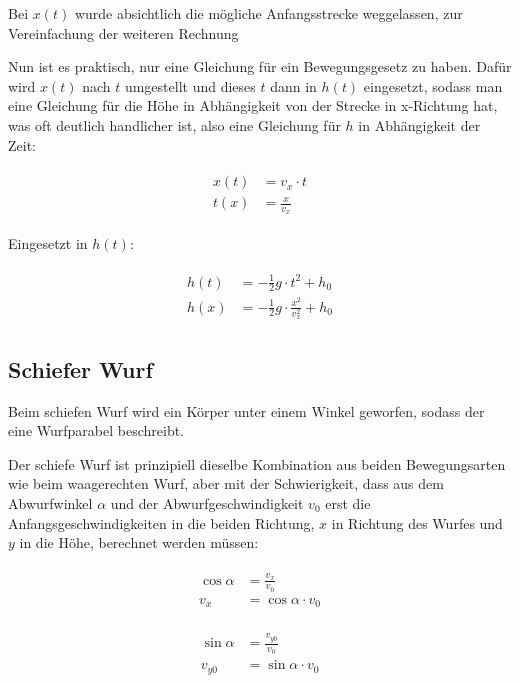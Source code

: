 \noindent Bei $x(t)$ wurde absichtlich die mögliche Anfangsstrecke weggelassen, zur Vereinfachung der weiteren Rechnung

Nun ist es praktisch, nur eine Gleichung für ein Bewegungsgesetz zu haben. Dafür wird $x(t)$ nach $t$ umgestellt und dieses $t$ dann in $h(t)$  eingesetzt, sodass man eine Gleichung für die Höhe in Abhängigkeit von der Strecke in x-Richtung hat, was oft deutlich handlicher ist, also eine Gleichung für $h$ in Abhängigkeit der Zeit:

\begin{align}
\begin{split}
	x(t) &= v_x \cdot t \\
	t(x) &= \frac{x}{v_x}
\end{split}
\end{align}

\noindent Eingesetzt in $h(t)$:

\begin{align} \label{eq:waagerechtgesamt}
\begin{split}
	h(t) &= -\frac{1}{2}g \cdot t^2 + h_0 \\
	h(x) &= -\frac{1}{2}g \cdot \frac{x^2}{v_x^2} + h_0
\end{split}
\end{align}


\subsection{Schiefer Wurf}

Beim schiefen Wurf wird ein Körper unter einem Winkel geworfen, sodass der eine Wurfparabel beschreibt.

Der schiefe Wurf ist prinzipiell dieselbe Kombination aus beiden Bewegungsarten wie beim waagerechten Wurf, aber mit der Schwierigkeit, dass aus dem Abwurfwinkel $\alpha$ und der Abwurfgeschwindigkeit $v_0$ erst die Anfangsgeschwindigkeiten in die beiden Richtung, $x$ in Richtung des Wurfes und $y$ in die Höhe, berechnet werden müssen:

\begin{align}
\begin{split}
	\cos{\alpha} &= \frac{v_x}{v_0} \\
	v_x &= \cos{\alpha} \cdot v_0
\end{split}
\end{align}

\begin{align}
\begin{split}
	\sin{\alpha} &= \frac{v_{y0}}{v_0} \\
	v_{y0} &= \sin{\alpha} \cdot v_0
\end{split}
\end{align}

